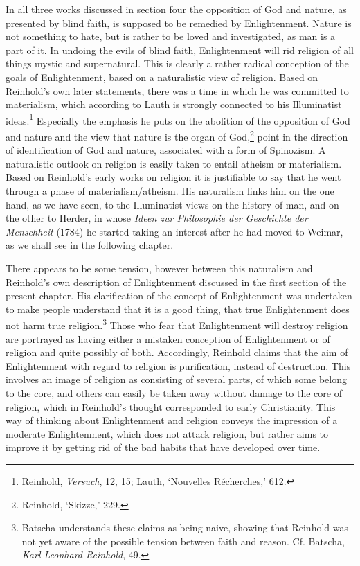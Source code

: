  In all three works discussed in section four the opposition of God and nature, as presented by blind faith, is supposed to be remedied by Enlightenment. Nature is not something to hate, but is rather to be loved and investigated, as man is a part of it. In undoing the evils of blind faith, Enlightenment will rid religion of all things mystic and supernatural. This is clearly a rather radical conception of the goals of Enlightenment, based on a naturalistic view of religion. Based on Reinhold's own later statements, there was a time in which he was committed to materialism, which according to Lauth is strongly connected to his Illuminatist ideas.\footnote{ Reinhold, \textit{Versuch}, 12, 15; Lauth, `Nouvelles R\'{e}cherches,' 612.} Especially the emphasis he puts on the abolition of the opposition of God and nature and the view that nature is the organ of God,\footnote{ Reinhold, `Skizze,' 229.} point in the direction of identification of God and nature, associated with a form of Spinozism. A naturalistic outlook on religion is easily taken to entail atheism or materialism. Based on Reinhold's early works on religion it is justifiable to say that he went through a phase of materialism/atheism. His naturalism links him on the one hand, as we have seen, to the Illuminatist views on the history of man, and on the other to Herder, in whose \textit{Ideen zur Philosophie der Geschichte der Menschheit }(1784) he started taking an interest after he had moved to Weimar, as we shall see in the following chapter.

 There appears to be some tension, however between this naturalism and Reinhold's own description of Enlightenment discussed in the first section of the present chapter. His clarification of the concept of Enlightenment was undertaken to make people understand that it is a good thing, that true Enlightenment does not harm true religion.\footnote{ Batscha understands these claims as being naive, showing that Reinhold was not yet aware of the possible tension between faith and reason. Cf. Batscha, \textit{Karl Leonhard Reinhold}, 49.} Those who fear that Enlightenment will destroy religion are portrayed as having either a mistaken conception of Enlightenment or of religion and quite possibly of both. Accordingly, Reinhold claims that the aim of Enlightenment with regard to religion is purification, instead of destruction. This involves an image of religion as consisting of several parts, of which some belong to the core, and others can easily be taken away without damage to the core of religion, which in Reinhold's thought corresponded to early Christianity. This way of thinking about Enlightenment and religion conveys the impression of a moderate Enlightenment, which does not attack religion, but rather aims to improve it by getting rid of the bad habits that have developed over time. 

